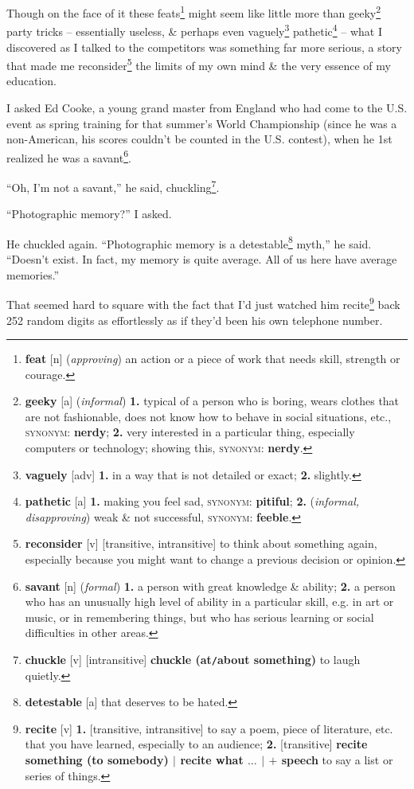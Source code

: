 \documentclass[oneside]{book}
\numberwithin{equation}{section}
\begin{document}
Though on the face of it these feats\footnote{\textbf{feat} [n] (\textit{approving}) an action or a piece of work that needs skill, strength or courage.} might seem like little more than geeky\footnote{\textbf{geeky} [a] (\textit{informal}) \textbf{1.} typical of a person who is boring, wears clothes that are not fashionable, does not know how to behave in social situations, etc., \textsc{synonym}: \textbf{nerdy}; \textbf{2.} very interested in a particular thing, especially computers or technology; showing this, \textsc{synonym}: \textbf{nerdy}.} party tricks -- essentially useless, \& perhaps even vaguely\footnote{\textbf{vaguely} [adv] \textbf{1.} in a way that is not detailed or exact; \textbf{2.} slightly.} pathetic\footnote{\textbf{pathetic} [a] \textbf{1.} making you feel sad, \textsc{synonym}: \textbf{pitiful}; \textbf{2.} (\textit{informal, disapproving}) weak \& not successful, \textsc{synonym}: \textbf{feeble}.} -- what I discovered as I talked to the competitors was something far more serious, a story that made me reconsider\footnote{\textbf{reconsider} [v] [transitive, intransitive] to think about something again, especially because you might want to change a previous decision or opinion.} the limits of my own mind \& the very essence of my education.

I asked Ed Cooke, a young grand master from England who had come to the U.S. event as spring training for that summer's World Championship (since he was a non-American, his scores couldn't be counted in the U.S. contest), when he 1st realized he was a savant\footnote{\textbf{savant} [n] (\textit{formal}) \textbf{1.} a person with great knowledge \& ability; \textbf{2.} a person who has an unusually high level of ability in a particular skill, e.g. in art or music, or in remembering things, but who has serious learning or social difficulties in other areas.}.

``Oh, I'm not a savant,'' he said, chuckling\footnote{\textbf{chuckle} [v] [intransitive] \textbf{chuckle (at\texttt{/}about something)} to laugh quietly.}.

``Photographic memory?'' I asked.

He chuckled again. ``Photographic memory is a detestable\footnote{\textbf{detestable} [a] that deserves to be hated.} myth,'' he said. ``Doesn't exist. In fact, my memory is quite average. All of us here have average memories.''

That seemed hard to square with the fact that I'd just watched him recite\footnote{\textbf{recite} [v] \textbf{1.} [transitive, intransitive] to say a poem, piece of literature, etc. that you have learned, especially to an audience; \textbf{2.} [transitive] \textbf{recite something (to somebody) $|$ recite what $\ldots$ $|$ $+$ speech} to say a list or series of things.} back 252 random digits as effortlessly as if they'd been his own telephone number.
\end{document}

